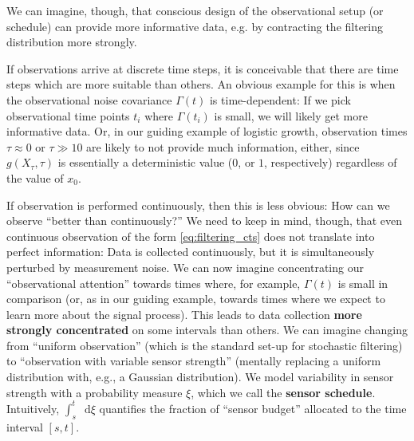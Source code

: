 \documentclass[10pt]{article}
\numberwithin{equation}{section}
\numberwithin{figure}{section}
\theoremstyle{remark}
\newcommand{\dd }{\mathop{}\!\mathrm{d}}
\begin{document}
We can imagine, though, that conscious design of the observational setup (or schedule) can provide more informative data, e.g. by contracting the filtering distribution more strongly.

If observations arrive at discrete time steps, it is conceivable that there are time steps which are more suitable than others. An obvious example for this is when the observational noise covariance $\Gamma(t)$ is time-dependent: If we pick observational time points $t_i$ where $\Gamma(t_i)$ is small, we will likely get more informative data. Or, in our guiding example of logistic growth, observation times $\tau\approx 0$ or $\tau \gg 10$ are likely to not provide much information, either, since $g(X_\tau,\tau)$ is essentially a deterministic value ($0$, or $1$, respectively) regardless of the value of $x_0$.

If observation is performed continuously, then this is less obvious: How can we observe ``better than continuously?'' We need to keep in mind, though, that even continuous observation of the form \eqref{eq:filtering_cts} does not translate into perfect information: Data is collected continuously, but it is simultaneously perturbed by measurement noise. We can now imagine concentrating our ``observational attention'' towards times where, for example, $\Gamma(t)$ is small in comparison (or, as in our guiding example, towards times where we expect to learn more about the signal process). This leads to data collection \textbf{more strongly concentrated} on some intervals than others. We can imagine changing from ``uniform observation'' (which is the standard set-up for stochastic filtering) to ``observation with variable sensor strength'' (mentally replacing a uniform distribution with, e.g., a Gaussian distribution). We model variability in sensor strength with a probability measure $\xi$, which we call the \textbf{sensor schedule}. Intuitively, $\int_s^t \dd\xi$ quantifies the fraction of ``sensor budget'' allocated to the time interval $[s,t]$. 
\end{document}
